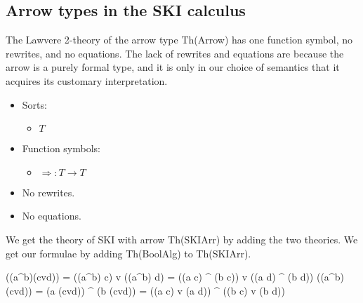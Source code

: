 \documentclass{article}
\newcommand{\maps}{\colon}
\newcommand{\lhom}{\Rightarrow}
\begin{document}
\subsection{Arrow types in the SKI calculus}

The Lawvere 2-theory of the arrow type Th(Arrow) has one function symbol, no rewrites, and no equations.  The lack of rewrites and equations are because the arrow is a purely formal type, and it is only in our choice of semantics that it acquires its customary interpretation.
\begin{itemize}
  \item Sorts:
  \begin{itemize}
    \item $T$
  \end{itemize}
  \item Function symbols:
    \begin{itemize}
      \item $\lhom\maps T \to T$
    \end{itemize}
  \item No rewrites.
  \item No equations.
\end{itemize}

We get the theory of SKI with arrow Th(SKIArr) by adding the two theories.  We get our formulae by adding Th(BoolAlg) to Th(SKIArr).

((a^b)(cvd)) = ((a^b) c) v ((a^b) d) = ((a c) ^ (b c)) v ((a d) ^ (b d))
((a^b)(cvd)) = (a (cvd)) ^ (b (cvd)) = ((a c) v (a d)) ^ ((b c) v (b d))
\end{document}
